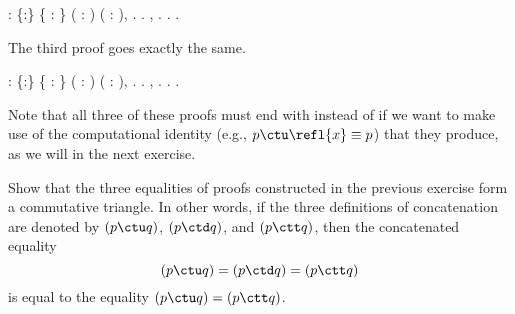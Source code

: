  \begin{coqdoccode}
\coqdocemptyline
\coqdocnoindent
{}  : \coqdockw{\ensuremath{\forall}} \{:\} \{   : \} ( :  \coqdocnotation{=} ) ( :  \coqdocnotation{=} ), \coqdoceol
\coqdocindent{1.00em}
\coqdocnotation{(}  \coqdocnotation{)} \coqdocnotation{=} \coqdocnotation{(}  \coqdocnotation{)}.\coqdoceol
\coqdocnoindent
{}.\coqdoceol
\coqdocindent{1.00em}
 , . .\coqdoceol
\coqdocnoindent
{}.\coqdoceol
\coqdocemptyline
\end{coqdoccode}
The third proof goes exactly the same. \begin{coqdoccode}
\coqdocemptyline
\coqdocnoindent
{}  : \coqdockw{\ensuremath{\forall}} \{:\} \{   : \} ( :  \coqdocnotation{=} ) ( :  \coqdocnotation{=} ), \coqdoceol
\coqdocindent{1.00em}
\coqdocnotation{(}  \coqdocnotation{)} \coqdocnotation{=} \coqdocnotation{(}  \coqdocnotation{)}.\coqdoceol
\coqdocnoindent
{}.\coqdoceol
\coqdocindent{1.00em}
 , . .\coqdoceol
\coqdocnoindent
{}.\coqdoceol
\coqdocemptyline
\end{coqdoccode}
\noindent
Note that all three of these proofs must end with  instead of  if
we want to make use of the computational identity (e.g., $p \ctu \refl{x}
\equiv p$)
that they produce, as we will in the next exercise.
 

Show that the three equalities of proofs constructed in the previous
exercise form a commutative triangle.  In other words, if the three
definitions of concatenation are denoted by $(p \ctu q)$, $(p \ctd
q)$, and $(p \ctt q)$, then the concatenated equality
\[
  (p \ctu q) = (p \ctd q) = (p \ctt q)
\]
is equal to the equality $(p \ctu q) = (p \ctt q)$.
 

